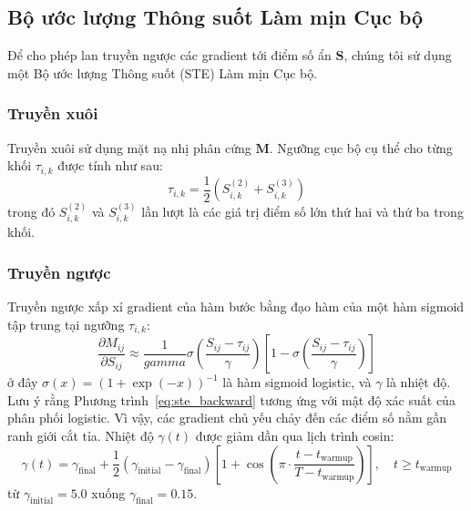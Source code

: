 \documentclass[11pt]{article}
\begin{document}
\subsection{Bộ ước lượng Thông suốt Làm mịn Cục bộ}\label{subsec:ste}

Để cho phép lan truyền ngược các gradient tới điểm số ẩn $\bm{S}$, chúng tôi sử dụng một Bộ ước lượng Thông suốt (STE) Làm mịn Cục bộ.

\subsubsection{Truyền xuôi}
Truyền xuôi sử dụng mặt nạ nhị phân cứng $\bm{M}$. Ngưỡng cục bộ cụ thể cho từng khối $\tau_{i, k}$ được tính như sau:
\begin{equation}\label{eq:tau}
    \tau_{i, k} = \frac{1}{2} \left( S_{i, k}^{(2)} + S_{i, k}^{(3)} \right)
\end{equation}
trong đó $S_{i, k}^{(2)}$ và $S_{i, k}^{(3)}$ lần lượt là các giá trị điểm số lớn thứ hai và thứ ba trong khối.

\subsubsection{Truyền ngược}
Truyền ngược xấp xỉ gradient của hàm bước bằng đạo hàm của một hàm sigmoid tập trung tại ngưỡng $\tau_{i, k}$:
\begin{equation}\label{eq:ste_backward}
    \frac{\partial M_{ij}}{\partial S_{ij}} \approx \frac{1}{gamma} \sigma\left(\frac{S_{ij} - \tau_{ij}}{\gamma}\right) \left[ 1 - \sigma\left(\frac{S_{ij} - \tau_{ij}}{\gamma}\right) \right]
\end{equation}
ở đây $\sigma(x) = (1 + \exp(-x))^{-1}$ là hàm sigmoid logistic, và $\gamma$ là nhiệt độ. Lưu ý rằng Phương trình~\ref{eq:ste_backward} tương ứng với mật độ xác suất của phân phối logistic. Vì vậy, các gradient chủ yếu chảy đến các điểm số nằm gần ranh giới cắt tỉa. Nhiệt độ $\gamma(t)$ được giảm dần qua lịch trình cosin:
\begin{equation}\label{eq:gamma_anneal}
    \gamma(t) = \gamma_{\text{final}} + \frac{1}{2}(\gamma_{\text{initial}} - \gamma_{\text{final}})\left[1 + \cos\!\left(\pi \cdot \frac{t - t_{\text{warmup}}}{T - t_{\text{warmup}}}\right)\right], \quad t \ge t_{\text{warmup}}
\end{equation}
từ $\gamma_{\text{initial}} = 5.0$ xuống $\gamma_{\text{final}} = 0.15$.
\end{document}
